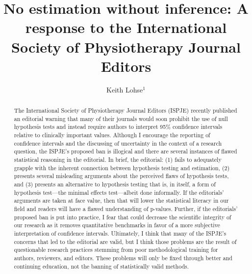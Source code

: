 \documentclass[]{cik}%
\begin{document}
\captionsetup[table]{labelformat=empty}
\captionsetup[figure]{labelformat=empty}
\raggedbottom

\title{No estimation without inference: A response to the International
Society of Physiotherapy Journal Editors}

\author{
Keith Lohse$^{1}$}

\address{
  $^{1}$Physical Therapy and Neurology, Washington University School of
Medicine, Saint Louis, MO}
\subject{
Metascience}






\begin{abstract}
The International Society of Physiotherapy Journal Editors (ISPJE)
recently published an editorial warning that many of their journals
would soon prohibit the use of null hypothesis tests and instead require
authors to interpret 95\% confidence intervals relative to clinically
important values. Although I encourage the reporting of confidence
intervals and the discussing of uncertainty in the context of a research
question, the ISPJE's proposed ban is illogical and there are several
instances of flawed statistical reasoning in the editorial. In brief,
the editorial: (1) fails to adequately grapple with the inherent
connection between hypothesis testing and estimation, (2) presents
several misleading arguments about the perceived flaws of hypothesis
tests, and (3) presents an alternative to hypothesis testing that is, in
itself, a form of hypothesis test---the minimal effects test---albeit
done informally. If the editorials' arguments are taken at face value,
then that will lower the statistical literacy in our field and readers
will have a flawed understanding of p-values. Further, if the
editorials' proposed ban is put into practice, I fear that could
decrease the scientific integrity of our research as it removes
quantitative benchmarks in favor of a more subjective interpretation of
confidence intervals. Ultimately, I think that many of the ISPJE's
concerns that led to the editorial are valid, but I think those problems
are the result of questionable research practices stemming from poor
methodological training for authors, reviewers, and editors. These
problems will only be fixed through better and continuing education, not
the banning of statistically valid methods.
\end{abstract}
\end{document}
